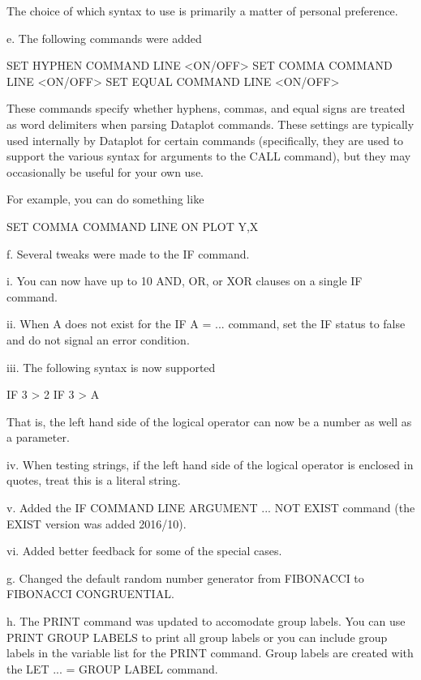        The choice of which syntax to use is primarily a matter of personal
       preference.

    e. The following commands were added

          SET HYPHEN COMMAND LINE <ON/OFF>
          SET COMMA COMMAND LINE  <ON/OFF>
          SET EQUAL COMMAND LINE  <ON/OFF>

       These commands specify whether hyphens, commas, and equal signs
       are treated as word delimiters when parsing Dataplot commands.
       These settings are typically used internally by Dataplot for
       certain commands (specifically, they are used to support the
       various syntax for arguments to the CALL command), but they may
       occasionally be useful for your own use.

       For example, you can do something like

          SET COMMA COMMAND LINE ON
          PLOT Y,X

    f. Several tweaks were made to the IF command.

          i. You can now have up to 10 AND, OR, or XOR clauses on a
             single IF command.

         ii. When A does not exist for the IF A = ... command, set the IF
             status to false and do not signal an error condition.

        iii. The following syntax is now supported

                IF 3 > 2
                IF 3 > A

              That is, the left hand side of the logical operator can
              now be a number as well as a parameter.

          iv. When testing strings, if the left hand side of the logical
              operator is enclosed in quotes, treat this is a literal
              string.

           v. Added the IF COMMAND LINE ARGUMENT ... NOT EXIST command
              (the EXIST version was added 2016/10).

          vi. Added better feedback for some of the special cases.

    g. Changed the default random number generator from FIBONACCI to
       FIBONACCI CONGRUENTIAL.

    h. The PRINT command was updated to accomodate group labels.  You
       can use PRINT GROUP LABELS to print all group labels or you
       can include group labels in the variable list for the PRINT
       command.  Group labels are created with the LET ... = GROUP LABEL
       command.

